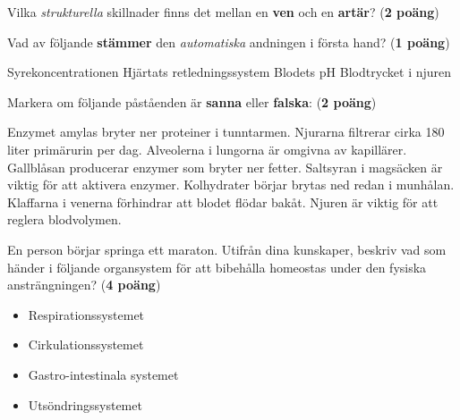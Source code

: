 \documentclass{exam}
\begin{document}
\begin{questions}
\vspace{5mm}
\question Vilka \textit{strukturella} skillnader finns det mellan en \textbf{ven} och en \textbf{artär}? (\textbf{2 poäng})
\vspace{40mm}

\question Vad av följande \textbf{stämmer} den \textit{automatiska} andningen i första hand? (\textbf{1 poäng})
\begin{checkboxes}
    \choice Syrekoncentrationen
    \choice Hjärtats retledningssystem
    \choice Blodets pH
    \choice Blodtrycket i njuren
\end{checkboxes}
\vspace{5mm}

\question Markera om följande påståenden är \textbf{sanna} eller \textbf{falska}: (\textbf{2 poäng})

\begin{oneparchoices}
    \choice Enzymet amylas bryter ner proteiner i tunntarmen. \hfill
    \vspace{2mm}
    \choice Njurarna filtrerar cirka 180 liter primärurin per dag. \hfill
    \vspace{2mm}
    \choice Alveolerna i lungorna är omgivna av kapillärer. \hfill
    \vspace{2mm}
    \choice Gallblåsan producerar enzymer som bryter ner fetter. \hfill
    \vspace{2mm}
    \choice Saltsyran i magsäcken är viktig för att aktivera enzymer. \hfill
    \vspace{2mm}
    \choice Kolhydrater börjar brytas ned redan i munhålan. \hfill
    \vspace{2mm}
    \choice Klaffarna i venerna förhindrar att blodet flödar bakåt. \hfill
    \vspace{2mm}
    \choice Njuren är viktig för att reglera blodvolymen. \hfill

\end{oneparchoices}


\break

\vspace{5mm} %
\begin{center}
\end{center}


\question
En person börjar springa ett maraton. Utifrån dina kunskaper, beskriv vad som händer i följande organsystem för att bibehålla homeostas under den fysiska ansträngningen? (\textbf{4 poäng})
\begin{itemize}
    \item Respirationssystemet
    \item Cirkulationssystemet
    \item Gastro-intestinala systemet
    \item Utsöndringssystemet
\end{itemize}
\vspace{100mm}


\end{questions}
\end{document}
